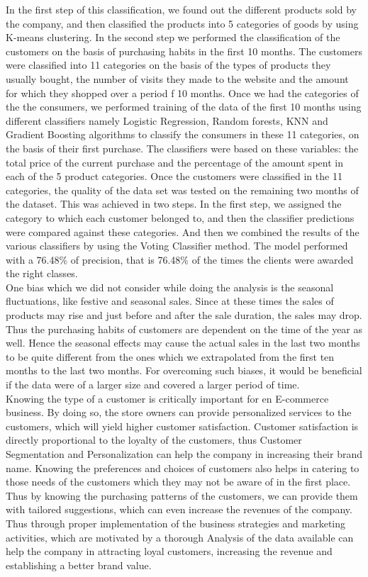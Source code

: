 In the first step of this classification, we found out the different products sold by the company, and then classified the products into 5 categories of goods by using K-means clustering. In the second step we performed the classification of the customers on the basis of purchasing habits in the first 10 months. The customers were classified into 11 categories on the basis of the types of products they usually bought, the number of visits they made to the website and the amount for which they shopped over a period f 10 months. Once we had the categories of the the consumers, we performed training of the data of the first 10 months using different classifiers namely Logistic Regression, Random forests, KNN and Gradient Boosting algorithms to classify the consumers in these 11 categories, on the basis of their first purchase. The classifiers were based on these variables: the total price of the current purchase and the percentage of the amount spent in each of the 5 product categories. Once the customers were classified in the 11 categories, the quality of the data set was tested on the remaining two months of the dataset. This was achieved in two steps. In the first step, we assigned the category to which each customer belonged to, and then the classifier predictions were compared against these categories. And then we combined the results of the various classifiers by using the Voting Classifier method. The model performed with a 76.48\% of precision, that is 76.48\% of the times the clients were awarded the right classes.\\
One bias which we did not consider while doing the analysis is the seasonal fluctuations, like festive and seasonal sales. Since at these times the sales of products may rise and just before and after the sale duration, the sales may drop. Thus the purchasing habits of customers are dependent on the time of the year as well. Hence the seasonal effects may cause the actual sales in the last two months to be quite different from the ones which we extrapolated  from the first ten months to the last two months. For overcoming such biases, it would be beneficial if the data were of a larger size and covered a larger period of time.\\
Knowing the type of a customer is critically important for en E-commerce business. By doing so, the store owners can provide personalized services to the customers, which will yield higher customer satisfaction. Customer satisfaction is directly proportional to the loyalty of the customers, thus Customer Segmentation and Personalization can help the company in increasing their brand name. Knowing the preferences and choices of customers also helps in catering to those needs of the customers which they may not be aware of in the first place. Thus by knowing the purchasing patterns of the customers, we can provide them with tailored suggestions, which can even increase the revenues of the company. Thus through proper implementation of the business strategies and marketing activities, which are motivated by a thorough Analysis of the data available can help the company in attracting loyal customers, increasing the revenue and establishing a better brand value.  

